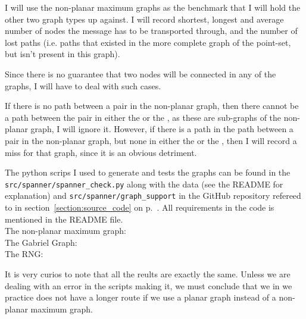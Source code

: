 I will use the non-planar maximum graphs as the benchmark that I will hold the other two graph types up against. I will record shortest, longest and average number of nodes the message has to be transported through, and the number of lost paths (i.e. paths that existed in the more complete graph of the point-set, but isn't present in this graph). 

Since there is no guarantee that two nodes will be connected in any of the graphs, I will have to deal with such cases.

If there is no path between a pair in the non-planar graph, then there cannot be a path between the pair in either the \gabe or the \rng, as these are sub-graphs of the non-planar graph, I will ignore it. However, if there is a path in the path between a pair in the non-planar graph, but none in either the \gabe or the \rng, then I will record a miss for that graph, since it is an obvious detriment. 

The python scrips I used to generate and tests the graphs can be found in the \texttt{src/spanner/spanner\_check.py} along with the data (see the README for explanation) and \texttt{src/spanner/graph\_support} in the GitHub repository refereed to in section~\ref{section:source_code} on p.~\pageref{section:source_code}. All requirements in the code is mentioned in the README file.\\

The non-planar maximum graph:
\\

The Gabriel Graph:
\\

The RNG:


It is very curios to note that all the reults are exactly the same. Unless we are dealing with an error in the scripts making it, we must conclude that we in we practice does not have a longer route if we use a planar graph instead of a non-planar maximum graph.
